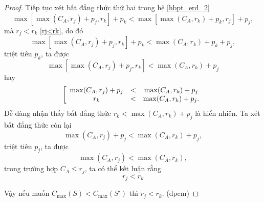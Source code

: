 \begin{proof}
	Tiếp tục xét bất đẳng thức thứ hai trong hệ \eqref{hbpt_erd_2}
	\begin{equation}
		\max \left[ \max (C_A, r_j) + p_j, r_k \right] + p_k < \max \left[ \max (C_A, r_k) + p_k, r_j \right] + p_j,
	\end{equation}
	mà $r_j<r_k$ \eqref{rj<rk}, do đó
	\begin{equation}
		\max \left[ \max (C_A, r_j) + p_j, r_k \right] + p_k < \max (C_A, r_k) + p_k + p_j,
	\end{equation}
	triệt tiêu $p_k$, ta được
	\begin{equation}
		\max \left[ \max (C_A, r_j) + p_j, r_k \right] < \max (C_A, r_k) + p_j
	\end{equation}
	hay
	\begin{equation}
		\left[
			\begin{array}{c c c}
				\max (C_A, r_j) + p_j &<& \max (C_A, r_k) + p_j \\
				r_k &<& \max (C_A, r_k) + p_j.
			\end{array}
		\right.
	\end{equation}
	Dễ dàng nhận thấy bất đẳng thức $r_k < \max (C_A, r_k) + p_j$ là hiển nhiên. Ta xét bất đẳng thức còn lại
	\begin{equation}
			\max (C_A, r_j) + p_j < \max (C_A, r_k) + p_j,
	\end{equation}
	triệt tiêu $p_j$, ta được
	\begin{equation}
			\max (C_A, r_j) < \max (C_A, r_k),
	\end{equation}
	trong trường hợp $C_A \leq r_j$, ta có thể kết luận rằng
	\begin{equation}
			r_j < r_k
	\end{equation}

	Vậy nếu muốn $C_{\max}(S) < C_{\max}(S')$ thì $r_j < r_k$. (đpcm)
\end{proof}

\phantom{text}

\phantom{text}